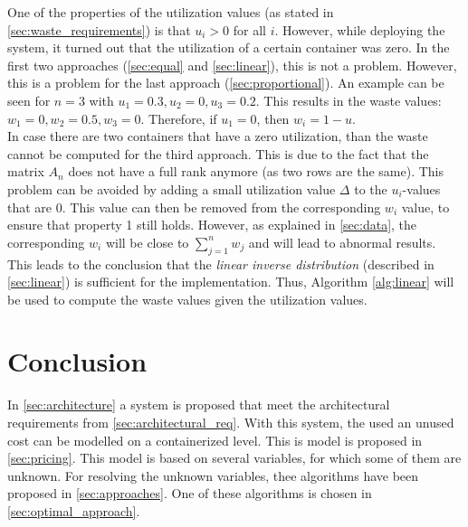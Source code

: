 \noindent
One of the properties of the utilization values (as stated in \autoref{sec:waste_requirements}) is that $u_i > 0$ for all $i$. However, while deploying the system, it turned out that the utilization of a certain container was zero. In the first two approaches (\autoref{sec:equal} and \autoref{sec:linear}), this is not a problem. However, this is a problem for the last approach (\autoref{sec:proportional}). An example can be seen for $n = 3$ with $u_1 = 0.3, u_2 = 0, u_3 = 0.2$. This results in the waste values: $w_1 = 0, w_2 = 0.5, w_3 = 0$. Therefore, if $u_1 = 0$, then $w_i = 1 - u$.\\

\noindent
In case there are two containers that have a zero utilization, than the waste cannot be computed for the third approach. This is due to the fact that the matrix $A_n$ does not have a full rank anymore (as two rows are the same). This problem can be avoided by adding a small utilization value $\Delta$ to the $u_i$-values that are $0$. This value can then be removed from the corresponding $w_i$ value, to ensure that property 1 still holds. However, as explained in \autoref{sec:data}, the corresponding $w_i$ will be close to $\sum_{j=1}^n w_j$ and will lead to abnormal results. This leads to the conclusion that the \textit{linear inverse distribution} (described in \autoref{sec:linear}) is sufficient for the implementation. Thus, Algorithm \ref{alg:linear} will be used to compute the waste values given the utilization values.

\section{Conclusion}
In \autoref{sec:architecture} a system is proposed that meet the architectural requirements from \autoref{sec:architectural_req}. With this system, the used an unused cost can be modelled on a containerized level. This is model is proposed in \autoref{sec:pricing}. This model is based on several variables, for which some of them are unknown. For resolving the unknown variables, thee algorithms have been proposed in \autoref{sec:approaches}. One of these algorithms is chosen in \autoref{sec:optimal_approach}.